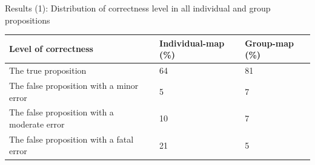\begin{frame}{Results (1): Distribution of correctness level in all individual and group propositions}
\begin{table}[tb]
    \label{dist_correct}
    \begin{center}
        \begin{tabular}{ p{5cm}|p{2cm}|p{2cm}  }
            \hline
            Level of correctness & Individual-map (\%) & Group-map (\%)\\
            \hline
            The true proposition & 64 & 81 \\
            The false proposition with a minor error & 5 & 7 \\
            The false proposition with a moderate error & 10 & 7 \\
            The false proposition with a fatal error & 21 & 5 \\
            \hline
        \end{tabular}
    \end{center}
\end{table}
\end{frame}

